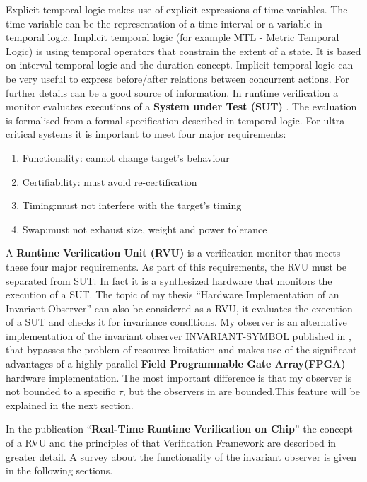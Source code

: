 Explicit temporal logic makes use of explicit expressions of time variables. The time variable can be the representation of a time interval or a variable in temporal logic. 
Implicit temporal logic (for example MTL - Metric Temporal Logic) is using temporal operators that constrain the extent of a state.
It is based on interval temporal logic and the duration concept.
Implicit temporal logic can be very useful to express before/after relations between concurrent actions.
For further details \cite{210306} can be a good source of information.
In runtime verification a monitor evaluates executions of a \textbf{System under Test (SUT)} \cite{RTFMBJ13}. 
The evaluation is formalised from a formal specification described in temporal logic.\newpage
For ultra critical systems it is important to meet four major requirements:
\begin{enumerate}
 \item Functionality: cannot change target's behaviour
 \item Certifiability: must avoid re-certification
 \item Timing:must not interfere with the target's timing
 \item Swap:must not exhaust size, weight and power tolerance
\end{enumerate}

A \textbf{Runtime Verification Unit (RVU)} is a verification monitor that meets these four major requirements.
As part of this requirements, the RVU must be separated from SUT.
In fact it is a synthesized hardware that monitors the execution of a SUT.\newline
The topic of my thesis ``Hardware Implementation of an Invariant Observer'' can also be considered as a RVU, 
it evaluates the execution of a SUT and checks it for invariance conditions. 
My observer is an alternative implementation of the invariant observer INVARIANT-SYMBOL published in \cite{RTFMBJ13}, 
that bypasses the problem of resource limitation and makes use of the significant advantages of a highly parallel
\textbf{Field Programmable Gate Array(FPGA)} hardware implementation.
The most important difference is that my observer is not bounded to a specific $\tau$, but the observers in \cite{RTFMBJ13}
are bounded.This feature will be explained in the next section.

In the publication ``\textbf{Real-Time Runtime Verification on Chip}'' \cite{RTFMBJ13} the concept of a RVU and 
the principles of that Verification Framework are described in greater detail.\newline\newline
A survey about the functionality of the invariant observer is given in the following sections.




